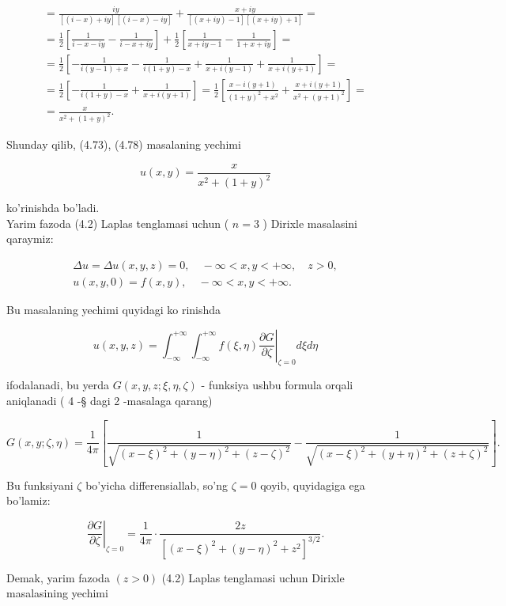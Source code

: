 \documentclass[10pt]{article}
\begin{document}
$$
\begin{gathered}
=\frac{i y}{[(i-x)+i y][(i-x)-i y]}+\frac{x+i y}{[(x+i y)-1][(x+i y)+1]}= \\
=\frac{1}{2}\left[\frac{1}{i-x-i y}-\frac{1}{i-x+i y}\right]+\frac{1}{2}\left[\frac{1}{x+i y-1}-\frac{1}{1+x+i y}\right]= \\
=\frac{1}{2}\left[-\frac{1}{i(y-1)+x}-\frac{1}{i(1+y)-x}+\frac{1}{x+i(y-1)}+\frac{1}{x+i(y+1)}\right]= \\
=\frac{1}{2}\left[-\frac{1}{i(1+y)-x}+\frac{1}{x+i(y+1)}\right]=\frac{1}{2}\left[\frac{x-i(y+1)}{(1+y)^{2}+x^{2}}+\frac{x+i(y+1)}{x^{2}+(y+1)^{2}}\right]= \\
=\frac{x}{x^{2}+(1+y)^{2}} .
\end{gathered}
$$

Shunday qilib, (4.73), (4.78) masalaning yechimi

$$
u(x, y)=\frac{x}{x^{2}+(1+y)^{2}}
$$

ko'rinishda bo'ladi.\\
Yarim fazoda (4.2) Laplas tenglamasi uchun ( $n=3$ ) Dirixle masalasini qaraymiz:

$$
\begin{gathered}
\Delta u=\Delta u(x, y, z)=0, \quad-\infty<x, y<+\infty, \quad z>0, \\
u(x, y, 0)=f(x, y), \quad-\infty<x, y<+\infty .
\end{gathered}
$$

Bu masalaning yechimi quyidagi ko rinishda

$$
u(x, y, z)=\left.\int_{-\infty}^{+\infty} \int_{-\infty}^{+\infty} f(\xi, \eta) \frac{\partial G}{\partial \zeta}\right|_{\zeta=0} d \xi d \eta
$$

ifodalanadi, bu yerda $G(x, y, z ; \xi, \eta, \zeta)$ - funksiya ushbu formula orqali aniqlanadi ( 4 -§ dagi 2 -masalaga qarang)

$$
G(x, y ; \zeta, \eta)=\frac{1}{4 \pi}\left[\frac{1}{\sqrt{(x-\xi)^{2}+(y-\eta)^{2}+(z-\zeta)^{2}}}-\frac{1}{\sqrt{(x-\xi)^{2}+(y+\eta)^{2}+(z+\zeta)^{2}}}\right] .
$$

Bu funksiyani $\zeta$ bo'yicha differensiallab, so'ng $\zeta=0$ qoyib, quyidagiga ega bo'lamiz:

$$
\left.\frac{\partial G}{\partial \zeta}\right|_{\zeta=0}=\frac{1}{4 \pi} \cdot \frac{2 z}{\left[(x-\xi)^{2}+(y-\eta)^{2}+z^{2}\right]^{3 / 2}} .
$$

Demak, yarim fazoda $(z>0)$ (4.2) Laplas tenglamasi uchun Dirixle masalasining yechimi
\end{document}
